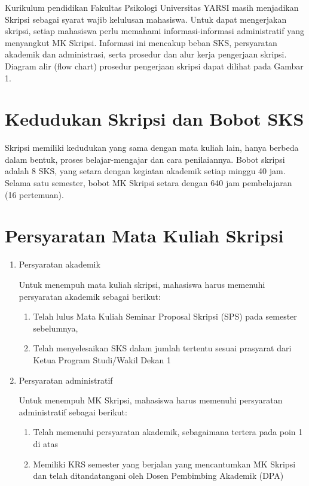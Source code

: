 \documentclass[
  indonesian,
  letterpaper,
]{scrbook}
\providecommand{\tightlist}{%
  \setlength{\itemsep}{0pt}\setlength{\parskip}{0pt}}
\begin{document}
Kurikulum pendidikan Fakultas Psikologi Universitas YARSI masih
menjadikan Skripsi sebagai syarat wajib kelulusan mahasiswa. Untuk dapat
mengerjakan skripsi, setiap mahasiswa perlu memahami informasi-informasi
administratif yang menyangkut MK Skripsi. Informasi ini mencakup beban
SKS, persyaratan akademik dan administrasi, serta prosedur dan alur
kerja pengerjaan skripsi. Diagram alir (flow chart) prosedur pengerjaan
skripsi dapat dilihat pada Gambar 1.

\section{Kedudukan Skripsi dan Bobot
SKS}\label{kedudukan-skripsi-dan-bobot-sks}

Skripsi memiliki kedudukan yang sama dengan mata kuliah lain, hanya
berbeda dalam bentuk, proses belajar-mengajar dan cara penilaiannya.
Bobot skripsi adalah 8 SKS, yang setara dengan kegiatan akademik setiap
minggu 40 jam. Selama satu semester, bobot MK Skripsi setara dengan 640
jam pembelajaran (16 pertemuan).

\section{Persyaratan Mata Kuliah
Skripsi}\label{persyaratan-mata-kuliah-skripsi}

\begin{enumerate}
\def\labelenumi{\arabic{enumi}.}
\item
  Persyaratan akademik

  Untuk menempuh mata kuliah skripsi, mahasiswa harus memenuhi
  persyaratan akademik sebagai berikut:

  \begin{enumerate}
  \def\labelenumii{\alph{enumii}.}
  \tightlist
  \item
    Telah lulus Mata Kuliah Seminar Proposal Skripsi (SPS) pada semester
    sebelumnya,
  \item
    Telah menyelesaikan SKS dalam jumlah tertentu sesuai prasyarat dari
    Ketua Program Studi/Wakil Dekan 1
  \end{enumerate}
\item
  Persyaratan administratif

  Untuk menempuh MK Skripsi, mahasiswa harus memenuhi persyaratan
  administratif sebagai berikut:

  \begin{enumerate}
  \def\labelenumii{\alph{enumii}.}
  \item
    Telah memenuhi persyaratan akademik, sebagaimana tertera pada poin 1
    di atas
  \item
    Memiliki KRS semester yang berjalan yang mencantumkan MK Skripsi dan
    telah ditandatangani oleh Dosen Pembimbing Akademik (DPA)
  \end{enumerate}
\end{enumerate}
\end{document}
